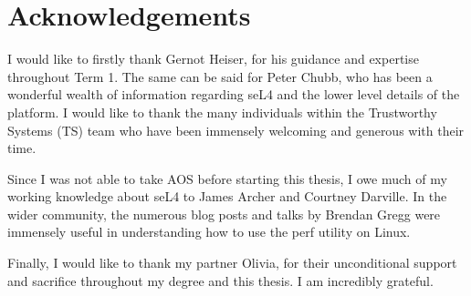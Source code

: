 \chapter*{Acknowledgements}\label{ch:ack}

I would like to firstly thank Gernot Heiser, for his guidance and expertise throughout Term 1. The same can be said for Peter Chubb, who has been a wonderful wealth of information regarding seL4 and the lower level details of the platform. I would like to thank the many individuals within the Trustworthy Systems (TS) team who have been immensely welcoming and generous with their time.

Since I was not able to take AOS before starting this thesis, I owe much of my working knowledge about seL4 to James Archer and Courtney Darville. In the wider community, the numerous blog posts and talks by Brendan Gregg were immensely useful in understanding how to use the perf utility on Linux.

Finally, I would like to thank my partner Olivia, for their unconditional support and sacrifice throughout my degree and this thesis. I am incredibly grateful.
